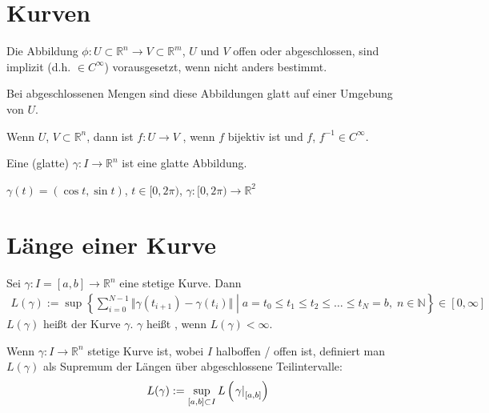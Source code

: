 \section{Kurven}

\begin{underlinedenvironment}[Konvention]
	Die Abbildung $\phi\!:U\subset\mathbb{R}^n\to V\subset\mathbb{R}^m$, $U$ und $V$ offen oder abgeschlossen, sind implizit  (d.h. $\in C^\infty$) vorausgesetzt, wenn nicht anders bestimmt.
	
	Bei abgeschlossenen Mengen sind diese Abbildungen glatt auf einer Umgebung von $U$.
\end{underlinedenvironment}

\begin{definition}
	Wenn $U$, $V\subset\mathbb{R}^n$, dann ist $f\!:U\to V$ , wenn $f$ bijektiv ist und $f$, $f^{-1}\in C^\infty$.
\end{definition}

\begin{definition}
	Eine (glatte)  $\gamma\!: I\to \mathbb{R}^n$ ist eine glatte Abbildung.
\end{definition}

\begin{example}
	$\gamma(t) = (\cos t, \sin t)$, $t\in [0,2\pi)$, $\gamma:[0,2\pi)\to\mathbb{R}^2$
\end{example}

\section{Länge einer Kurve}
\begin{definition}
	Sei $\gamma\!:I=[a,b]\to \mathbb{R}^n$ eine stetige Kurve. Dann \begin{align}
		L(\gamma) := \sup \left\lbrace \left. \sum_{i=0}^{N-1} \Vert \gamma(t_{i+1}) - \gamma(t_i) \Vert \;\right|\; a = t_0 \le t_1 \le t_2 \le \dotsc \le t_N = b,\; n\in\mathbb{N}\right\rbrace \in [0,\infty]
	\end{align}
	$L(\gamma)$ heißt  der Kurve $\gamma$. $\gamma$ heißt , wenn $L(\gamma) < \infty$.
\end{definition}

\begin{underlinedenvironment}[Bemerkung]
	Wenn $\gamma\!:I\to\mathbb{R}^n$ stetige Kurve ist, wobei $I$ halboffen / offen ist, definiert man $L(\gamma)$ als Supremum der Längen über abgeschlossene Teilintervalle: \begin{align}
		L(\gamma) := \sup\limits_{[a,b]\subset I} L\left(\left.\gamma_{\rule{0pt}{2mm}}\right|_{[a,b]}\right)
	\end{align}
\end{underlinedenvironment}

